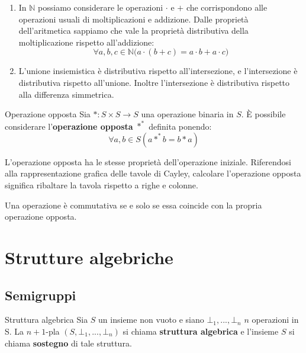 \begin{example}
\begin{enumerate}
	\item 	In $\mathbb{N}$ possiamo considerare le operazioni $\cdot$ e $+$ che corrispondono alle operazioni usuali di moltiplicazioni e addizione. Dalle proprietà dell'aritmetica sappiamo che vale la proprietà distributiva della moltiplicazione rispetto all'addizione:
	\begin{displaymath}
		\forall a,b,c \in \mathbb{N} \bigl(a \cdot (b+c) = a \cdot b + a \cdot c \bigr)
	\end{displaymath}
	\item L'unione insiemistica è distributiva rispetto all'intersezione, e l'intersezione è distributiva rispetto all'unione. Inoltre l'intersezione è distributiva rispetto alla differenza simmetrica.
\end{enumerate}
\end{example}

\begin{defbox}{Operazione opposta}
	Sia $\ast: S \times S \longrightarrow S$ una operazione binaria in $S$. È possibile considerare l'\textbf{operazione opposta} $\ast^{\ast}$ definita ponendo:
	\begin{equation}
		\forall a,b \in S (a \ast^{\ast}b=b \ast a)
	\end{equation}
	
\end{defbox}
L'operazione opposta ha le stesse proprietà dell'operazione iniziale. Riferendosi alla rappresentazione grafica delle tavole di Cayley, calcolare l'operazione opposta significa ribaltare la tavola rispetto a righe e colonne. 

\begin{osservation}
	Una operazione è commutativa se e solo se essa coincide con la propria operazione opposta.
\end{osservation}

\section{Strutture algebriche}
\subsection{Semigruppi}

\begin{defbox}{Struttura algebrica}
	Sia $S$ un insieme non vuoto e siano $\bot_{1},...,\bot_{n}$ $n$ operazioni in S. La $n+1$-pla $(S,\bot_{1},...,\bot_{n})$ si chiama \textbf{struttura algebrica} e l'insieme $S$ si chiama \textbf{sostegno} di tale struttura.
\end{defbox}

